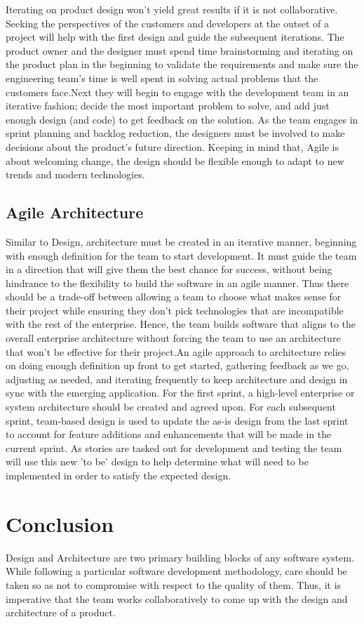 \documentclass[sigplan,screen]{acmart}
\begin{document}
Iterating on product design won't yield great results if it is not collaborative. Seeking the perspectives of the customers and developers at the outset of a project will help with the first design and guide the subsequent iterations. The product owner and the designer must spend time brainstorming and iterating on the product plan in the beginning to validate the requirements and make sure the engineering team’s time is well spent in solving actual problems that the customers face.Next they will begin to engage with the development team in an iterative fashion; decide the most important problem to solve, and add just enough design (and code) to get feedback on the solution. As the team engages in sprint planning and backlog reduction, the designers must be involved to make decisions about the product’s future direction. Keeping in mind that, Agile is about welcoming change, the design should be flexible enough to adapt to new trends and modern technologies.

\subsection{Agile Architecture}
Similar to Design, architecture must be created in an iterative manner, beginning with enough definition for the team to start development. It must guide the team in a direction that will give them the best chance for success, without being hindrance to the flexibility to build the software in an agile manner. Thus there should be a trade-off between allowing a team to choose what makes sense for their project while ensuring they don't pick technologies that are incompatible with the rest of the enterprise. Hence, the team builds software that aligns to the overall enterprise architecture without forcing the team to use an architecture that won’t be effective for their project.An agile approach to architecture relies on doing enough definition up front to get started, gathering feedback as we go, adjusting as needed, and iterating frequently to keep architecture and design in sync with the emerging application. For the first sprint, a high-level enterprise or system architecture should be created and agreed upon. For each subsequent sprint, team-based design is used to update the as-is design from the last sprint to account for feature additions and enhancements that will be made in the current sprint. As stories are tasked out for development and testing the team will use this new 'to be' design to help determine what will need to be implemented in order to satisfy the expected design.

\section{Conclusion}
Design and Architecture are two primary building blocks of any software system. While following a particular software development methodology, care should be taken so as not to compromise with respect to the quality of them. Thus, it is imperative that the team works collaboratively to come up with the design and architecture of a product.





\end{document}
